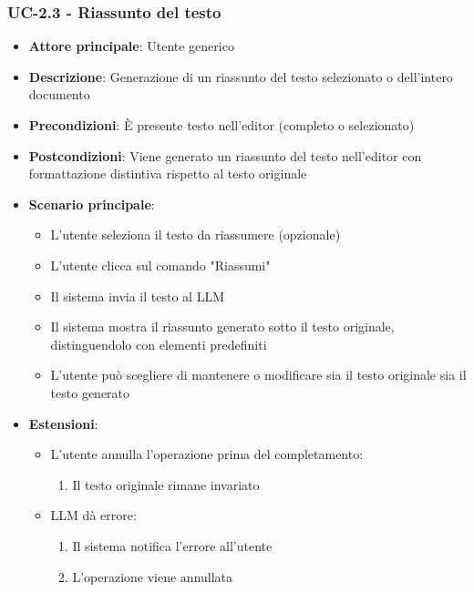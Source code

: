\documentclass[11pt,a4paper]{article}
\begin{document}
\subsubsection{UC-2.3 - Riassunto del testo}
\begin{itemize}
    \item \textbf{Attore principale}: Utente generico
    \item \textbf{Descrizione}: Generazione di un riassunto del testo selezionato o dell'intero documento
    \item \textbf{Precondizioni}: È presente testo nell'editor (completo o selezionato)
    \item \textbf{Postcondizioni}: Viene generato un riassunto del testo nell'editor con formattazione distintiva rispetto al testo originale
    \item \textbf{Scenario principale}:
        \begin{itemize}
            \item L'utente seleziona il testo da riassumere (opzionale)
            \item L'utente clicca sul comando "Riassumi"
            \item Il sistema invia il testo al LLM
            \item Il sistema mostra il riassunto generato sotto il testo originale, distinguendolo con elementi predefiniti
            \item L'utente può scegliere di mantenere o modificare sia il testo originale sia il testo generato
        \end{itemize}
    \item \textbf{Estensioni}:
        \begin{itemize}
            \item L'utente annulla l'operazione prima del completamento:
                \begin{enumerate}
                    \item Il testo originale rimane invariato
                \end{enumerate}
            \item LLM dà errore:
                \begin{enumerate}
                    \item Il sistema notifica l'errore all'utente
                    \item L'operazione viene annullata
                \end{enumerate}
        \end{itemize}
\end{itemize}
\end{document}

